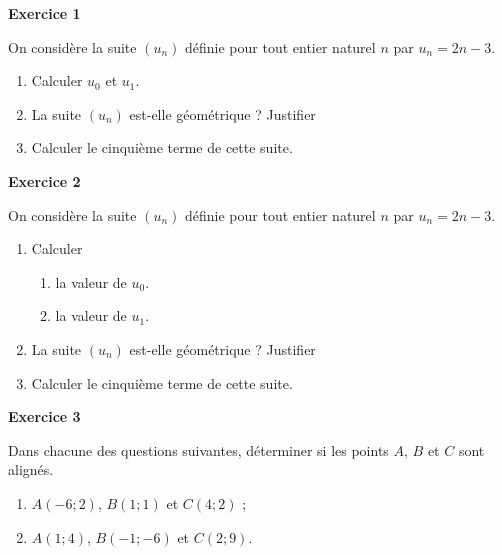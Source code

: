 \documentclass[12pt,a4paper]{article}
\providecommand{\tightlist}{%
  \setlength{\itemsep}{0pt}\setlength{\parskip}{0pt}}
\begin{document}
\medskip

\newpage

\textbf{Exercice 1}

On considère la suite \((u_n)\) définie pour tout entier naturel \(n\)
par \(u_n = 2n-3\).

\begin{enumerate}
\def\labelenumi{\arabic{enumi})}
\tightlist
\item
  Calculer \(u_0\) et \(u_1\).
\item
  La suite \((u_n)\) est-elle géométrique ? Justifier
\item
  Calculer le cinquième terme de cette suite.
\end{enumerate}

\bigskip

\textbf{Exercice 2}

On considère la suite \((u_n)\) définie pour tout entier naturel \(n\)
par \(u_n = 2n-3\).

\begin{enumerate}
\def\labelenumi{\arabic{enumi}.}
\tightlist
\item
  Calculer

  \begin{enumerate}
  \def\labelenumii{\alph{enumii}.}
  \tightlist
  \item
    la valeur de \(u_0\).
  \item
    la valeur de \(u_1\).
  \end{enumerate}
\item
  La suite \((u_n)\) est-elle géométrique ? Justifier
\item
  Calculer le cinquième terme de cette suite.
\end{enumerate}

\bigskip

\textbf{Exercice 3}

Dans chacune des questions suivantes, déterminer si les points \(A\),
\(B\) et \(C\) sont alignés.

\begin{enumerate}
\def\labelenumi{\alph{enumi}.}
\tightlist
\item
  \(A(-6;2)\), \(B(1;1)\) et \(C(4;2)\) ;
\item
  \(A(1;4)\), \(B(-1;-6)\) et \(C(2;9)\).
\end{enumerate}
\end{document}
